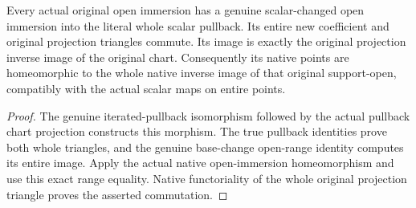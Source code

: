 \begin{lemma}
\label{lem:fc-scheme-scalar-open-chart}
\leanok
{}
Every actual original open immersion has a genuine scalar-changed open
immersion into the literal whole scalar pullback. Its entire new
coefficient and original projection triangles commute. Its image is
exactly the original projection inverse image of the original chart.
Consequently its native points are homeomorphic to the whole native
inverse image of that original support-open, compatibly with the actual
scalar maps on entire points.
\end{lemma}
\begin{proof}
The genuine iterated-pullback isomorphism followed by the actual
pullback chart projection constructs this morphism. The true pullback
identities prove both whole triangles, and the genuine base-change
open-range identity computes its entire image. Apply the actual native
open-immersion homeomorphism and use this exact range equality. Native
functoriality of the whole original projection triangle proves the
asserted commutation.
\end{proof}

